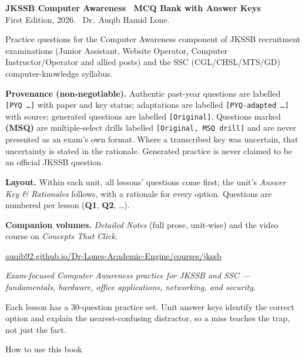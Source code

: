 \documentclass[11pt,a4paper,oneside]{report}
\renewcommand{\BAuthor}{Dr.\ Auqib Hamid Lone}
\renewcommand{\BWeb}{auqib92.github.io/Dr-Lones-Academic-Engine/courses/jkssb}
\renewcommand{\BWebURL}{https://auqib92.github.io/Dr-Lones-Academic-Engine/courses/jkssb/}
\begin{document}
\thispagestyle{plain}
\vspace*{\fill}
{\small
\noindent\textbf{JKSSB Computer Awareness \textemdash\ MCQ Bank with Answer Keys}\\
First Edition, 2026. \textcopyright\ \BAuthor.

\medskip
\noindent Practice questions for the Computer Awareness component of JKSSB
recruitment examinations (Junior Assistant, Website Operator, Computer
Instructor/Operator and allied posts) and the SSC (CGL/CHSL/MTS/GD)
computer-knowledge syllabus.

\medskip
\noindent\textbf{Provenance (non-negotiable).} Authentic past-year questions are
labelled \texttt{[PYQ~\ldots]} with paper and key status; adaptations are labelled
\texttt{[PYQ-adapted~\ldots]} with source; generated questions are labelled
\texttt{[Original]}. Questions marked \textbf{(MSQ)} are multiple-select drills
labelled \texttt{[Original, MSQ drill]} and are never presented as an exam's own
format. Where a transcribed key was uncertain, that uncertainty is stated in the
rationale. Generated practice is never claimed to be an official JKSSB question.

\medskip
\noindent\textbf{Layout.} Within each unit, all lessons' questions come first;
the unit's \emph{Answer Key \& Rationales} follows, with a rationale for every
option. Questions are numbered per lesson (\textbf{Q1}, \textbf{Q2}, \ldots).

\medskip
\noindent\textbf{Companion volumes.} \emph{Detailed Notes} (full prose, unit-wise)
and the video course on \emph{Concepts That Click}.

\medskip
\noindent\href{\BWebURL}{\BWeb}
}
\vspace*{\fill}
\clearpage

{}


\noindent\emph{Exam-focused Computer Awareness practice for JKSSB and SSC ---
fundamentals, hardware, office applications, networking, and security.}

\bigskip
Each lesson has a 30-question practice set. Unit answer keys identify the correct
option and explain the nearest-confusing distractor, so a miss teaches the trap,
not just the fact.

\vspace{0.6em}
\begin{fmbox}{How to use this book}
\end{fmbox}
\end{document}
